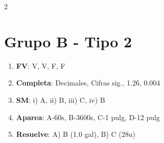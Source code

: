 \documentclass[a4paper,12pt]{article}
\begin{document}
\begin{multicols}{2}
\section*{Grupo B - Tipo 2}
\begin{enumerate}
    \item \textbf{FV}: V, V, F, F
    \item \textbf{Completa}: Decimales, Cifras sig., 1.26, 0.004
    \item \textbf{SM}: i) A, ii) B, iii) C, iv) B
    \item \textbf{Aparea}: A-60s, B-3600s, C-1 pulg, D-12 pulg
    \item \textbf{Resuelve}: A) B (1.0 gal), B) C (28u)
\end{enumerate}

\end{multicols}
\end{document}
